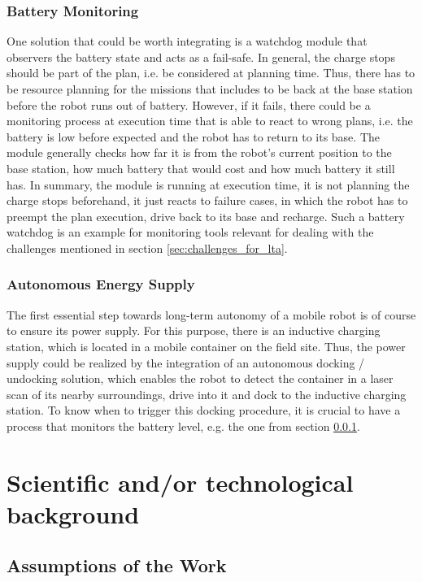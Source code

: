 \documentclass[english, master, expose, utf8]{base/thesis_KBS}
\begin{document}
\subsubsection{Battery Monitoring}
\label{sec:battery_monitoring}

One solution that could be worth integrating is a watchdog module that observers the battery state and acts as a fail-safe. In general, the charge stops should
be part of the plan, i.e. be considered at planning time. Thus, there has to be resource planning for the missions that includes to be back at the base station before
the robot runs out of battery. However, if it fails, there could be a monitoring process at execution time that is able to react to wrong plans, i.e. the battery is
low before expected and the robot has to return to its base. The module generally checks how far it is from the robot's current position to the base station, how much
battery that would cost and how much battery it still has. In summary, the module is running at execution time, it is not planning the charge stops beforehand,
it just reacts to failure cases, in which the robot has to preempt the plan execution, drive back to its base and recharge.
Such a battery watchdog is an example for monitoring tools relevant for dealing with the challenges mentioned in section \ref{sec:challenges_for_lta}.

\subsubsection{Autonomous Energy Supply}

The first essential step towards long-term autonomy of a mobile robot is of course to ensure its power supply.
For this purpose, there is an inductive charging station, which is located in a mobile container on the field site.
Thus, the power supply could be realized by the integration of an autonomous docking / undocking solution, which enables the robot to detect
the container in a laser scan of its nearby surroundings, drive into it and dock to the inductive charging station.
To know when to trigger this docking procedure, it is crucial to have a process that monitors the battery level, e.g. the one from section \ref{sec:battery_monitoring}.

\section{Scientific and/or technological background}

\subsection{Assumptions of the Work}
\end{document}
